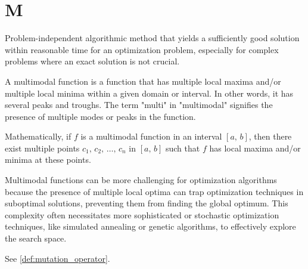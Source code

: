 \section*{M}
  \begin{definition}[Metaheuristics]
  \label{def:metaheuristic}
    Problem-independent algorithmic method that yields a sufficiently good solution within 
    reasonable time for an optimization problem, especially for complex problems where an exact 
    solution is not crucial.
  \end{definition}

  \begin{definition}
  \label{def:multimodal_function}
    A multimodal function is a function that has multiple local maxima and/or 
    multiple local minima within a given domain or interval.
    In other words, it has several peaks and troughs.
    The term "multi" in "multimodal" signifies the presence of multiple modes 
    or peaks in the function.

    Mathematically, if \(f\) is a multimodal function in an interval \([a,\, 
    b]\), then there exist multiple points \(c_1,\, c_2,\, \dots,\, c_n \) in 
    \([a,\, b]\) such that \(f\) has local maxima and/or minima at these points.
    
    Multimodal functions can be more challenging for optimization algorithms 
    because the presence of multiple local optima can trap optimization 
    techniques in suboptimal solutions, preventing them from finding the global 
    optimum.
    This complexity often necessitates more sophisticated or stochastic 
    optimization techniques, like simulated annealing or genetic algorithms, to 
    effectively explore the search space.           
  \end{definition}

  \begin{definition}[Mutator]
  \label{def:mutator}
    See \vref{def:mutation_operator}.
  \end{definition}